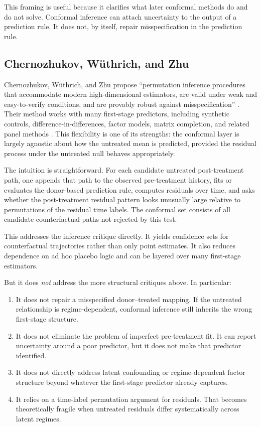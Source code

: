 \documentclass[11pt]{article}
\begin{document}
This framing is useful because it clarifies what later conformal methods do and do not solve. Conformal inference can attach uncertainty to the output of a prediction rule. It does not, by itself, repair misspecification in the prediction rule.

\subsection{Chernozhukov, W\"uthrich, and Zhu}

Chernozhukov, W\"uthrich, and Zhu propose \enquote{permutation inference procedures that accommodate modern high-dimensional estimators, are valid under weak and easy-to-verify conditions, and are provably robust against misspecification} \citep{Chernozhukov2021}. Their method works with many first-stage predictors, including synthetic controls, difference-in-differences, factor models, matrix completion, and related panel methods \citep{Chernozhukov2021}. This flexibility is one of its strengths: the conformal layer is largely agnostic about how the untreated mean is predicted, provided the residual process under the untreated null behaves appropriately.

The intuition is straightforward. For each candidate untreated post-treatment path, one appends that path to the observed pre-treatment history, fits or evaluates the donor-based prediction rule, computes residuals over time, and asks whether the post-treatment residual pattern looks unusually large relative to permutations of the residual time labels. The conformal set consists of all candidate counterfactual paths not rejected by this test.

This addresses the inference critique directly. It yields confidence sets for counterfactual trajectories rather than only point estimates. It also reduces dependence on ad hoc placebo logic and can be layered over many first-stage estimators.

But it does \emph{not} address the more structural critiques above. In particular:

\begin{enumerate}[label=(\alph*)]
    \item It does not repair a misspecified donor--treated mapping. If the untreated relationship is regime-dependent, conformal inference still inherits the wrong first-stage structure.
    \item It does not eliminate the problem of imperfect pre-treatment fit. It can report uncertainty around a poor predictor, but it does not make that predictor identified.
    \item It does not directly address latent confounding or regime-dependent factor structure beyond whatever the first-stage predictor already captures.
    \item It relies on a time-label permutation argument for residuals. That becomes theoretically fragile when untreated residuals differ systematically across latent regimes.
\end{enumerate}
\end{document}
